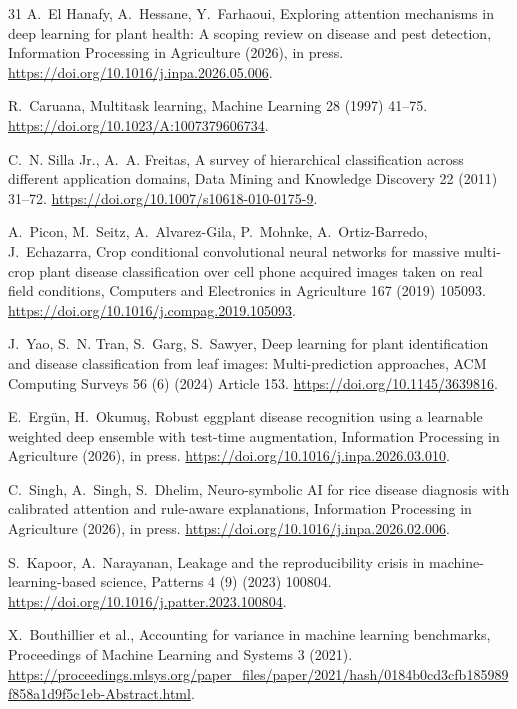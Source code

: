 \documentclass[preprint,12pt]{elsarticle}
\begin{document}
\begin{thebibliography}{31}
A.~El Hanafy, A.~Hessane, Y.~Farhaoui, Exploring attention mechanisms in deep
learning for plant health: A scoping review on disease and pest detection,
Information Processing in Agriculture (2026), in press.
\url{https://doi.org/10.1016/j.inpa.2026.05.006}.

R.~Caruana, Multitask learning, Machine Learning 28 (1997) 41--75.
\url{https://doi.org/10.1023/A:1007379606734}.

C.~N. Silla Jr., A.~A. Freitas, A survey of hierarchical classification across
different application domains, Data Mining and Knowledge Discovery 22 (2011)
31--72. \url{https://doi.org/10.1007/s10618-010-0175-9}.

A.~Picon, M.~Seitz, A.~Alvarez-Gila, P.~Mohnke, A.~Ortiz-Barredo,
J.~Echazarra, Crop conditional convolutional neural networks for massive
multi-crop plant disease classification over cell phone acquired images taken
on real field conditions, Computers and Electronics in Agriculture 167 (2019)
105093. \url{https://doi.org/10.1016/j.compag.2019.105093}.

J.~Yao, S.~N. Tran, S.~Garg, S.~Sawyer, Deep learning for plant identification
and disease classification from leaf images: Multi-prediction approaches, ACM
Computing Surveys 56 (6) (2024) Article 153.
\url{https://doi.org/10.1145/3639816}.

E.~Erg\"un, H.~Okumu\c{s}, Robust eggplant disease recognition using a
learnable weighted deep ensemble with test-time augmentation, Information
Processing in Agriculture (2026), in press.
\url{https://doi.org/10.1016/j.inpa.2026.03.010}.

C.~Singh, A.~Singh, S.~Dhelim, Neuro-symbolic AI for rice disease diagnosis
with calibrated attention and rule-aware explanations, Information Processing
in Agriculture (2026), in press.
\url{https://doi.org/10.1016/j.inpa.2026.02.006}.

S.~Kapoor, A.~Narayanan, Leakage and the reproducibility crisis in
machine-learning-based science, Patterns 4 (9) (2023) 100804.
\url{https://doi.org/10.1016/j.patter.2023.100804}.

X.~Bouthillier et al., Accounting for variance in machine learning benchmarks,
Proceedings of Machine Learning and Systems 3 (2021).
\url{https://proceedings.mlsys.org/paper_files/paper/2021/hash/0184b0cd3cfb185989f858a1d9f5c1eb-Abstract.html}.


\end{thebibliography}
\end{document}
